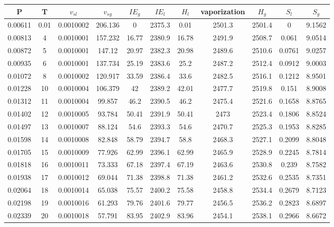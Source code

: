 \begin{longtable}{ccccccccccc}
\toprule
	\textbf{P} & \textbf{T} & $v_{sl}$ & $v_{sg}$ & $IE_{g}$ & $IE_{l}$ & $H_l$ & vaporization & $H_g$ & $S_l$ & $S_g$ \\
\midrule
\endhead
	0.00611 & 0.01  & 0.0010002 & 206.136  & 0      & 2375.3 & 0.01   & 2501.3 & 2501.4 & 0      & 9.1562      \\
	0.00813 & 4     & 0.0010001 & 157.232  & 16.77  & 2380.9 & 16.78  & 2491.9 & 2508.7 & 0.061  & 9.0514      \\
	0.00872 & 5     & 0.0010001 & 147.12   & 20.97  & 2382.3 & 20.98  & 2489.6 & 2510.6 & 0.0761 & 9.0257      \\
	0.00935 & 6     & 0.0010001 & 137.734  & 25.19  & 2383.6 & 25.2   & 2487.2 & 2512.4 & 0.0912 & 9.0003      \\
	0.01072 & 8     & 0.0010002 & 120.917  & 33.59  & 2386.4 & 33.6   & 2482.5 & 2516.1 & 0.1212 & 8.9501      \\
	0.01228 & 10    & 0.0010004 & 106.379  & 42     & 2389.2 & 42.01  & 2477.7 & 2519.8 & 0.151  & 8.9008      \\
	0.01312 & 11    & 0.0010004 & 99.857   & 46.2   & 2390.5 & 46.2   & 2475.4 & 2521.6 & 0.1658 & 8.8765      \\
	0.01402 & 12    & 0.0010005 & 93.784   & 50.41  & 2391.9 & 50.41  & 2473   & 2523.4 & 0.1806 & 8.8524      \\
	0.01497 & 13    & 0.0010007 & 88.124   & 54.6   & 2393.3 & 54.6   & 2470.7 & 2525.3 & 0.1953 & 8.8285      \\
	0.01598 & 14    & 0.0010008 & 82.848   & 58.79  & 2394.7 & 58.8   & 2468.3 & 2527.1 & 0.2099 & 8.8048      \\
	0.01705 & 15    & 0.0010009 & 77.926   & 62.99  & 2396.1 & 62.99  & 2465.9 & 2528.9 & 0.2245 & 8.7814      \\
	0.01818 & 16    & 0.0010011 & 73.333   & 67.18  & 2397.4 & 67.19  & 2463.6 & 2530.8 & 0.239  & 8.7582      \\
	0.01938 & 17    & 0.0010012 & 69.044   & 71.38  & 2398.8 & 71.38  & 2461.2 & 2532.6 & 0.2535 & 8.7351      \\
	0.02064 & 18    & 0.0010014 & 65.038   & 75.57  & 2400.2 & 75.58  & 2458.8 & 2534.4 & 0.2679 & 8.7123      \\
	0.02198 & 19    & 0.0010016 & 61.293   & 79.76  & 2401.6 & 79.77  & 2456.5 & 2536.2 & 0.2823 & 8.6897      \\
	0.02339 & 20    & 0.0010018 & 57.791   & 83.95  & 2402.9 & 83.96  & 2454.1 & 2538.1 & 0.2966 & 8.6672      \\

\end{longtable}
